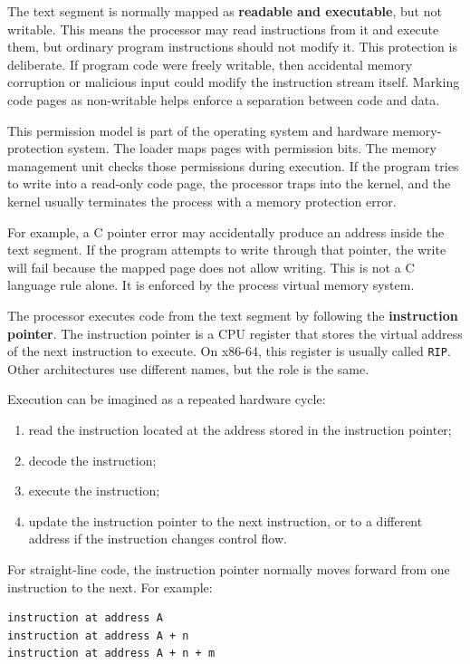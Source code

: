 The text segment is normally mapped as \textbf{readable and executable}, but not writable. This means the processor may read instructions from it and execute them, but ordinary program instructions should not modify it. This protection is deliberate. If program code were freely writable, then accidental memory corruption or malicious input could modify the instruction stream itself. Marking code pages as non-writable helps enforce a separation between code and data.

This permission model is part of the operating system and hardware memory-protection system. The loader maps pages with permission bits. The memory management unit checks those permissions during execution. If the program tries to write into a read-only code page, the processor traps into the kernel, and the kernel usually terminates the process with a memory protection error.

For example, a C pointer error may accidentally produce an address inside the text segment. If the program attempts to write through that pointer, the write will fail because the mapped page does not allow writing. This is not a C language rule alone. It is enforced by the process virtual memory system.

The processor executes code from the text segment by following the \textbf{instruction pointer}. The instruction pointer is a CPU register that stores the virtual address of the next instruction to execute. On x86-64, this register is usually called \texttt{RIP}. Other architectures use different names, but the role is the same.

Execution can be imagined as a repeated hardware cycle:

\begin{enumerate}
    \item read the instruction located at the address stored in the instruction pointer;
    \item decode the instruction;
    \item execute the instruction;
    \item update the instruction pointer to the next instruction, or to a different address if the instruction changes control flow.
\end{enumerate}

For straight-line code, the instruction pointer normally moves forward from one instruction to the next. For example:

\begin{verbatim}
instruction at address A
instruction at address A + n
instruction at address A + n + m
\end{verbatim}

